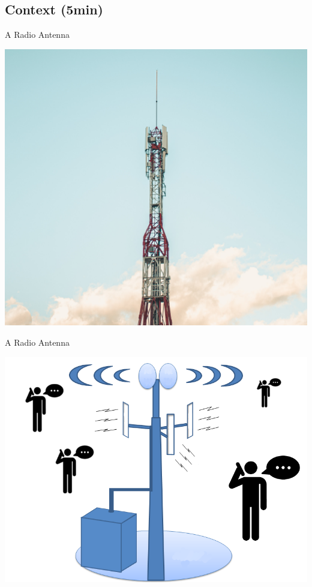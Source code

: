 \documentclass[10 pt]{beamer}
\begin{document}
\subsection{Context (5min)}
\begin{frame}{A Radio Antenna}
\begin{center}
  \includegraphics [width=\textwidth]{radio.jpg} 
\end{center}

\end{frame}
\begin{frame}{A Radio Antenna}
\begin{center}
  \includegraphics[scale=0.3]{btsppl.png}

\end{center}

\end{frame}
\end{document}
